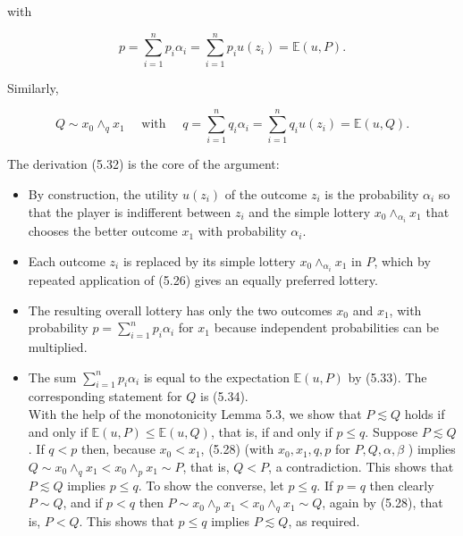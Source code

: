 \documentclass[12pt]{article}
\begin{document}
with


\begin{equation*}
p=\sum_{i=1}^{n} p_{i} \alpha_{i}=\sum_{i=1}^{n} p_{i} u\left(z_{i}\right)=\mathbb{E}(u, P) . \tag{5.33}
\end{equation*}


Similarly,


\begin{equation*}
Q \sim x_{0} \wedge_{q} x_{1} \quad \text { with } \quad q=\sum_{i=1}^{n} q_{i} \alpha_{i}=\sum_{i=1}^{n} q_{i} u\left(z_{i}\right)=\mathbb{E}(u, Q) . \tag{5.34}
\end{equation*}


The derivation (5.32) is the core of the argument:

\begin{itemize}
  \item By construction, the utility $u\left(z_{i}\right)$ of the outcome $z_{i}$ is the probability $\alpha_{i}$ so that the player is indifferent between $z_{i}$ and the simple lottery $x_{0} \wedge_{\alpha_{i}} x_{1}$ that chooses the better outcome $x_{1}$ with probability $\alpha_{i}$.
  \item Each outcome $z_{i}$ is replaced by its simple lottery $x_{0} \wedge_{\alpha_{i}} x_{1}$ in $P$, which by repeated application of (5.26) gives an equally preferred lottery.
  \item The resulting overall lottery has only the two outcomes $x_{0}$ and $x_{1}$, with probability $p=\sum_{i=1}^{n} p_{i} \alpha_{i}$ for $x_{1}$ because independent probabilities can be multiplied.
  \item The sum $\sum_{i=1}^{n} p_{i} \alpha_{i}$ is equal to the expectation $\mathbb{E}(u, P)$ by (5.33). The corresponding statement for $Q$ is (5.34).\\
With the help of the monotonicity Lemma 5.3, we show that $P \lesssim Q$ holds if and only if $\mathbb{E}(u, P) \leq \mathbb{E}(u, Q)$, that is, if and only if $p \leq q$. Suppose $P \lesssim Q$. If $q<p$ then, because $x_{0}<x_{1}$, (5.28) (with $x_{0}, x_{1}, q, p$ for $P, Q, \alpha, \beta$ ) implies $Q \sim x_{0} \wedge_{q} x_{1}<x_{0} \wedge_{p} x_{1} \sim P$, that is, $Q<P$, a contradiction. This shows that $P \lesssim Q$ implies $p \leq q$. To show the converse, let $p \leq q$. If $p=q$ then clearly $P \sim Q$, and if $p<q$ then $P \sim x_{0} \wedge_{p} x_{1}<x_{0} \wedge_{q} x_{1} \sim Q$, again by (5.28), that is, $P<Q$. This shows that $p \leq q$ implies $P \lesssim Q$, as required.
\end{itemize}
\end{document}
